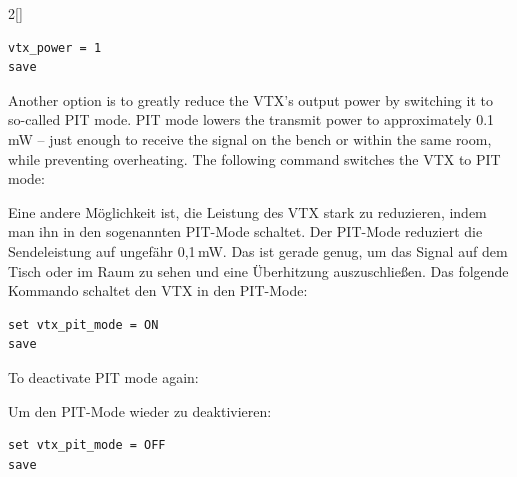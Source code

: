 \begin{paracol}{2}[]
\begin{lstlisting}[style=shell]
vtx_power = 1
save
\end{lstlisting}

\colstart

Another option is to greatly reduce the VTX’s output power by switching it to so-called PIT mode. PIT mode lowers the transmit power to approximately 0.1\,mW -- just enough to receive the signal on the bench or within the same room, while preventing overheating. The following command switches the VTX to PIT mode:

\colger

Eine andere Möglichkeit ist, die Leistung des VTX stark zu reduzieren, indem man ihn in den sogenannten PIT-Mode schaltet. Der PIT-Mode reduziert die Sendeleistung auf ungefähr 0,1\,mW. Das ist gerade genug, um das Signal auf dem Tisch oder im Raum zu sehen und eine Überhitzung auszuschließen. Das folgende Kommando schaltet den VTX in den PIT-Mode:

\colende



\begin{lstlisting}[style=shell]
set vtx_pit_mode = ON
save
\end{lstlisting}

\colstart

To deactivate PIT mode again:

\colger

Um den PIT-Mode wieder zu deaktivieren:

\colende




\begin{lstlisting}[style=shell]
set vtx_pit_mode = OFF
save
\end{lstlisting}
\colstart


\end{paracol}
